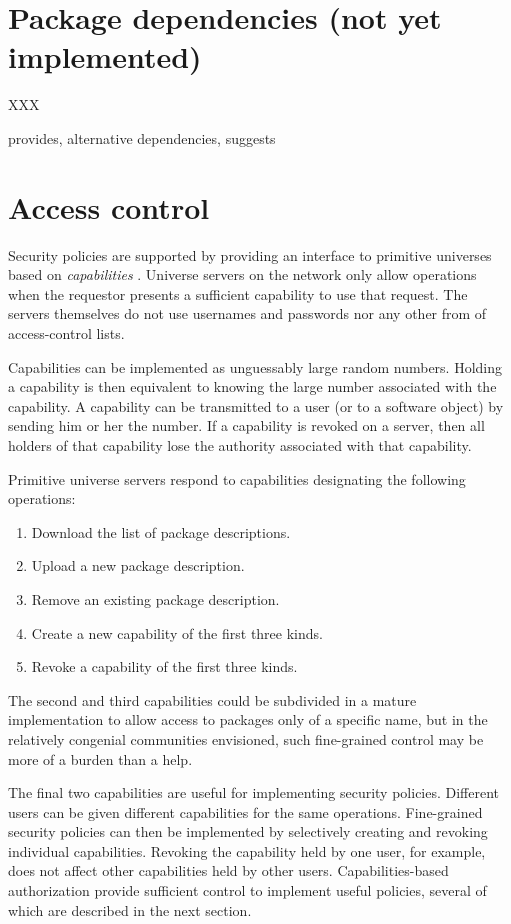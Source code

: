 \documentclass{article}
\begin{document}
\section{Package dependencies (not yet implemented)}

XXX

provides, alternative dependencies, suggests


\section{Access control}

Security policies are supported by providing an interface to
primitive universes based on \emph{capabilities} \cite{miller00:caps}.
Universe servers on the network only allow operations when the
requestor presents a sufficient capability to use that request.  The
servers themselves do not use usernames and passwords nor any other
from of access-control lists.

Capabilities can be implemented as unguessably large random numbers.
Holding a capability is then equivalent to knowing the large number
associated with the capability.  A capability can be transmitted to a
user (or to a software object) by sending him or her the number.  If a
capability is revoked on a server, then all holders of that capability
lose the authority associated with that capability.


Primitive universe servers respond to capabilities designating the
following operations:
\begin{enumerate}
\item Download the list of package descriptions.
\item Upload a new package description.
\item Remove an existing package description.
\item Create a new capability of the first three kinds.
\item Revoke a capability of the first three kinds.
\end{enumerate}
The second and third capabilities could be subdivided in a mature
implementation to allow access to packages only of a specific name,
but in the relatively congenial communities envisioned, such
fine-grained control may be more of a burden than a help.


The final two capabilities are useful for implementing security
policies.  Different users can be given different capabilities for the
same operations.  Fine-grained security policies can then be implemented by
selectively creating and revoking individual capabilities.  Revoking
the capability held by one user, for example, does not affect other
capabilities held by other users.
Capabilities-based authorization provide sufficient control to
implement useful policies, several of which are described in the next
section.
\end{document}
